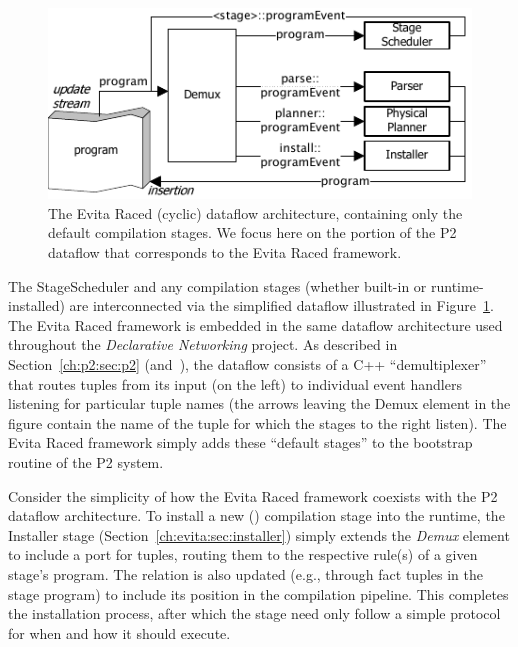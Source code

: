 \begin{figure}[htbp]
\begin{center}
\includegraphics[scale=1.5]{figures/DefaultCompiler}
\ssp
\caption{The Evita Raced (cyclic) dataflow architecture, containing only the 
default compilation stages. We focus here on the portion of the P2 dataflow
that corresponds to the Evita Raced framework.}
\label{ch:evita:fig:basecompiler}
\end{center}
\end{figure}

The StageScheduler and any compilation stages (whether built-in or
runtime-installed) are interconnected via the simplified dataflow illustrated in
Figure~\ref{ch:evita:fig:basecompiler}.  The Evita Raced framework is embedded
in the same dataflow architecture used throughout the {\em Declarative
Networking} project.  As described in Section~\ref{ch:p2:sec:p2}
(and~\cite{p2:sosp}), the dataflow consists of a C++ ``demultiplexer'' that
routes tuples from its input (on the left) to individual event handlers
listening for particular tuple names (the arrows leaving the Demux element in
the figure contain the name of the tuple for which the stages to the right
listen).  The Evita Raced framework simply adds these ``default stages'' to
the bootstrap routine of the P2 system.

Consider the simplicity of how the Evita Raced framework coexists with the P2
dataflow architecture.  To install a new (\OVERLOG) compilation stage into the
runtime, the Installer stage (Section~\ref{ch:evita:sec:installer}) simply extends
the {\em Demux} element to include a port for 
tuples, routing them to the respective rule(s) of a given stage's \OVERLOG
program. The  relation is also updated (e.g., through fact tuples
in the \OVERLOG stage program) to include its position in the compilation pipeline.
This completes the installation process, after which the \OVERLOG stage need only 
follow a simple protocol for when and how it should execute. 

